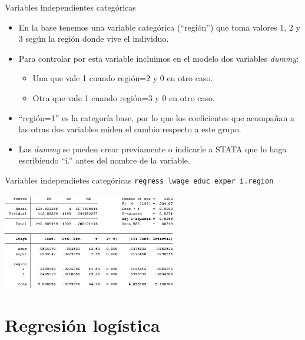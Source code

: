\documentclass{beamer}
\begin{document}
\begin{frame}{Variables independientes categóricas}
\begin{itemize}
\item En la base tenemos una variable categórica (``región'') que toma valores 1, 2 y 3 según la región donde vive el individuo. 
\item Para controlar por esta variable incluimos en el modelo dos variables \textit{dummy}: 
\begin{itemize}
\item Una que vale 1 cuando región=2 y 0 en otro caso.
\item Otra que vale 1 cuando región=3 y 0 en otro caso. 
\end{itemize}
\item ``región=1'' es la categoría base, por lo que los coeficientes que acompañan a las otras dos variables miden el cambio respecto a este grupo.
\item Las  \textit{dummy} se pueden crear previamente o indicarle a STATA que lo haga escribiendo ``i.'' antes del nombre de la variable.
\end{itemize}
\end{frame}

\begin{frame}{Variables independietes categóricas}{}
{\footnotesize \texttt{regress lwage educ exper i.region}}\\\medskip
\centerline{\includegraphics[height=4.2cm]{reg2.jpg}}
\end{frame}

\section{Regresión logística}
\end{document}
